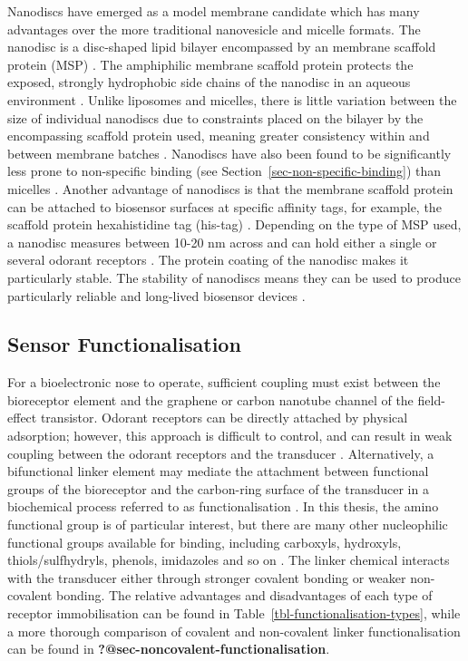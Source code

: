 \documentclass[
  a4paper,
]{scrbook}
\begin{document}
Nanodiscs have emerged as a model membrane candidate which has many
advantages over the more traditional nanovesicle and micelle formats.
The nanodisc is a disc-shaped lipid bilayer encompassed by an membrane
scaffold protein (MSP) \autocite{Nath2007,Bayburt2010,Yang2018}. The
amphiphilic membrane scaffold protein protects the exposed, strongly
hydrophobic side chains of the nanodisc in an aqueous environment
\autocite{Fruh2011,Yang2018}. Unlike liposomes and micelles, there is
little variation between the size of individual nanodiscs due to
constraints placed on the bilayer by the encompassing scaffold protein
used, meaning greater consistency within and between membrane batches
\autocite{Nath2007,Fruh2011}. Nanodiscs have also been found to be
significantly less prone to non-specific binding (see
Section~\ref{sec-non-specific-binding}) than micelles
\autocite{Fruh2011}. Another advantage of nanodiscs is that the membrane
scaffold protein can be attached to biosensor surfaces at specific
affinity tags, for example, the scaffold protein hexahistidine tag
(his-tag) \autocite{Bayburt2010,Fruh2011}. Depending on the type of MSP
used, a nanodisc measures between 10-20 nm across and can hold either a
single or several odorant receptors \autocite{Nath2007,Bayburt2010}. The
protein coating of the nanodisc makes it particularly stable. The
stability of nanodiscs means they can be used to produce particularly
reliable and long-lived biosensor devices
\autocite{Goldsmith2011,Yang2018,Moon2020,Cheema2021}.

\hypertarget{sec-sensor-types}{%
\subsection{Sensor Functionalisation}\label{sec-sensor-types}}

For a bioelectronic nose to operate, sufficient coupling must exist
between the bioreceptor element and the graphene or carbon nanotube
channel of the field-effect transistor. Odorant receptors can be
directly attached by physical adsorption; however, this approach is
difficult to control, and can result in weak coupling between the
odorant receptors and the transducer
\autocite{Kwon2015,Dung2018,Bohbot2020}. Alternatively, a bifunctional
linker element may mediate the attachment between functional groups of
the bioreceptor and the carbon-ring surface of the transducer in a
biochemical process referred to as functionalisation
\autocite{Star2003a}. In this thesis, the amino functional group is of
particular interest, but there are many other nucleophilic functional
groups available for binding, including carboxyls, hydroxyls,
thiols/sulfhydryls, phenols, imidazoles and so on
\autocite{Fruh2011,Dung2018}. The linker chemical interacts with the
transducer either through stronger covalent bonding or weaker
non-covalent bonding. The relative advantages and disadvantages of each
type of receptor immobilisation can be found in
Table~\ref{tbl-functionalisation-types}, while a more thorough
comparison of covalent and non-covalent linker functionalisation can be
found in \textbf{?@sec-noncovalent-functionalisation}.
\end{document}
